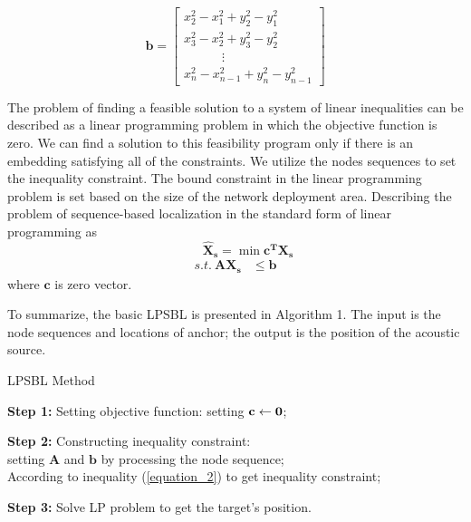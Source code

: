 \[\bm {b}=
\left[
\begin{array}{lcr}
x_2^2-x_1^2+y_2^2-y_1^2 \\
x_3^2-x_2^2+y_3^2-y_2^2 \\
  \quad \quad \quad  \vdots \\
x_n^2-x_{n-1}^2+y_n^2-y_{n-1}^2
\end{array}
\right]
\]


The problem of finding a feasible solution to a system of linear inequalities can be described as a linear programming problem in which the objective function is zero. 
We can find a solution to this feasibility program only if there is an embedding satisfying all of the constraints. 
We utilize the nodes sequences to set the inequality constraint.
The bound constraint in the linear programming problem is set based on the size of the network deployment area.
Describing the problem of sequence-based localization in the standard form of linear programming as
 \begin{equation} \label{6}
 \quad \quad \bm {\hat X_s} = \min {\bm{c^T}\bm{X_s}}
  \end{equation}
\begin{align*}
 s.t. \   \bm {{A}{X_s}} &\le \bm {b} 
\end{align*}
where $\bm {c}$ is zero vector.

To summarize, the basic LPSBL is presented in Algorithm 1. 
The input is the node sequences and locations of anchor; the output is the position of the acoustic source. 
\begin{algorithm}
\caption{LPSBL Method}

\textbf{Step 1:} Setting objective function: setting $\bf{c} \leftarrow \bf{0}$;

\textbf{Step 2:} Constructing inequality constraint: \\ 
\hspace{0.41in} setting $\bm{A}$ and $\bm{b}$ by processing the node sequence;\\
{
{
According to inequality (\ref{equation_2}) to get inequality constraint;
}
}

\textbf{Step 3:} Solve LP problem to get the target's position.

\end{algorithm}


